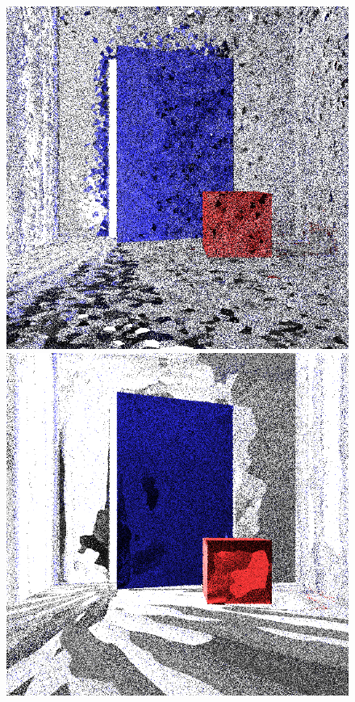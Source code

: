\documentclass[../dissertation.tex]{subfiles}
\begin{document}
\begin{figure}[h]
\centering
{}
  \includegraphics[width=\textwidth]{images/renders/max_dir/1_spp_sarsa_max_dir.png}   
  \label{fig:sarsa_1_spp}
\endminipage\hspace{5em}
  \includegraphics[width=\textwidth]{images/renders/max_dir/1_spp_nn_max_dir.png}

\end{figure}
\end{document}
